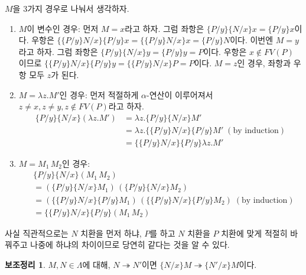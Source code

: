 \documentclass[b5paper]{book}
\theoremstyle{definition}
\newtheorem{lem}{보조정리}[chapter]
\newenvironment{pf*}{\pushQED{\qed}\pf}{\popQED\endpf}
\begin{document}
\begin{pf*}
    $M$을 3가지 경우로 나눠서 생각하자.
    \begin{enumerate}
        \item $M$이 변수인 경우: 
        먼저 $M = x$라고 하자. 그럼 좌항은 $\{P / y\} \{ N / x\} x = \{ P / y\} x$이다. 우항은
        $\{ \{P / y\} N / x \} \{P / y\} x = \{ \{P / y\} N / x \} x = \{P / y\} N$이다. 
        이번엔 $M = y$라고 하자. 그럼 좌항은 $\{P / y\} \{ N / x\} y = \{ P / y\} y = P$이다.
        우항은 $x \notin FV(P)$ 이므로 
        $\{ \{P / y\} N / x \} \{P / y\}  y = \{ \{P / y\} N / x \} P = P $이다. 
        $M= z$인 경우, 좌항과 우항 모두 $z$가 된다.
        \item $M = \lambda z. M'$인 경우: 먼저 적절하게 $\alpha$-연산이 이루어져서 $z \neq x,
        z \neq y, z \notin FV(P)$라고 하자.  
        \begin{align*}
            \{P / y\} \{ N / x\} (\lambda z. M') &= \lambda z. \{P / y\} \{ N / x\}  M' \\ 
            &=  \lambda z. \{ \{P / y\} N / x \} \{P / y \}  M' \; (\text{by induction})\\ 
            &=   \{ \{P / y\} N / x \} \{P / y \}  \lambda z. M' 
        \end{align*}
        \item $M = M_1 \, M_2$인 경우:
        \begin{align*}
            &\{P / y\} \{ N / x\} (M_1 \, M_2) \\ 
            & = (\{P / y\} \{ N / x\} M_1 ) \, 
            ( \{P / y\} \{ N / x\} M_2) \\
            &= (\{ \{P / y\} N / x \} \{P / y \} M_1) \, 
            (\{ \{P / y\} N / x \} \{P / y \} M_2) \; (\text{by induction}) \\
            &= \{ \{P / y\} N / x \} \{P / y \} (M_1 \, M_2)
        \end{align*}
    \end{enumerate}
\end{pf*}
사실 직관적으로는 $N$ 치환을 먼저 하냐, $P$를 하고 $N$ 치환을 $P$ 치환에 맞게 적절히 바꿔주고
나중에 하냐의 차이이므로 당연히 같다는 것을 알 수 있다.
\begin{lem} \label{lem3}
    $M, N \in \Lambda$에 대해, $N \twoheadrightarrow N'$이면 
    $\{N / x\}M \twoheadrightarrow \{N' / x\}M$이다.
\end{lem}
\end{document}
